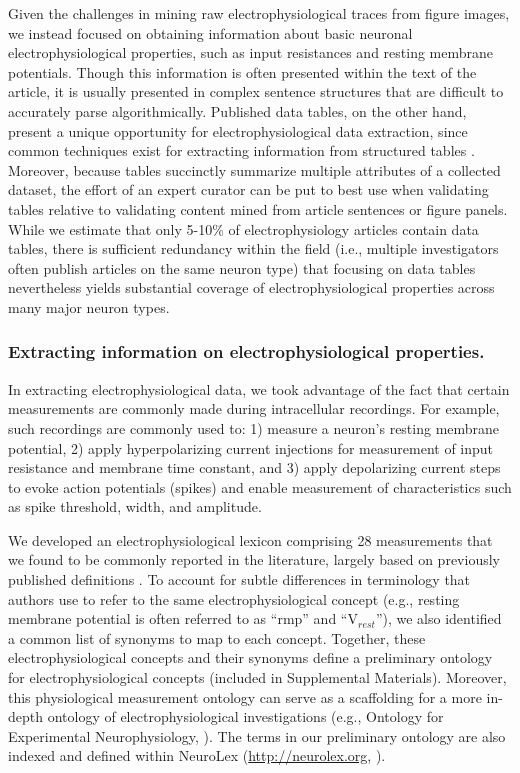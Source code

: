 \documentclass{template/frontiersSCNS} %
\begin{document}
Given the challenges in mining raw electrophysiological traces from figure images, we instead focused on obtaining information about basic neuronal electrophysiological properties, such as input resistances and resting membrane potentials.  
Though this information is often presented within the text of the article, it is usually presented in complex sentence structures that are difficult to accurately parse algorithmically.  
Published data tables, on the other hand, present a unique opportunity for electrophysiological data extraction, since common techniques exist for extracting information from structured tables \citep{yarkoni_large-scale_2011}.  
Moreover, because tables succinctly summarize multiple attributes of a collected dataset, the effort of an expert curator can be put to best use when validating tables relative to validating content mined from article sentences or figure panels.  
While we estimate that only 5-10\% of electrophysiology articles contain data tables, there is sufficient redundancy within the field (i.e., multiple investigators often publish articles on the same neuron type) that focusing on data tables nevertheless yields substantial coverage of electrophysiological properties across many major neuron types.

\subsubsection{Extracting information on electrophysiological properties.}
\label{sec:ephys_extraction}
In extracting electrophysiological data, we took advantage of the fact that certain measurements are commonly made during intracellular recordings.  
For example, such recordings are commonly used to: 
1) measure a neuron's resting membrane potential, 
2) apply hyperpolarizing current injections for measurement of input resistance and membrane time constant, and 
3) apply depolarizing current steps to evoke action potentials (spikes) and enable measurement of characteristics such as spike threshold, width, and amplitude.

We developed an electrophysiological lexicon comprising 28 measurements that we found to be commonly reported in the literature, largely based on previously published definitions \citep{toledo-rodriguez_correlation_2004,ascoli_petilla_2008}.  
To account for subtle differences in terminology that authors use to refer to the same electrophysiological concept (e.g., resting membrane potential is often referred to as ``rmp'' and ``V$_{rest}$''), we also identified a common list of synonyms to map to each concept.  
Together, these electrophysiological concepts and their synonyms define a preliminary ontology for electrophysiological concepts (included in Supplemental Materials).  
Moreover, this physiological measurement ontology can serve as a scaffolding for a more in-depth ontology of electrophysiological investigations (e.g., Ontology for Experimental Neurophysiology, \citet{bruha_ontology_2013}). 
The terms in our preliminary ontology are also indexed and defined within NeuroLex (\url{http://neurolex.org}, \citep{larson_neurolex.org:_2013}).   
  
\end{document}
